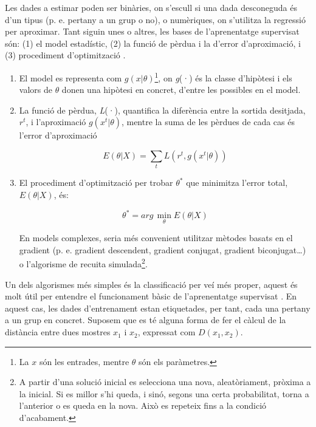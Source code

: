 \documentclass[12pt,a4paper,final,twoside]{article}
\begin{document}
Les dades a estimar poden ser binàries, on s'escull si una dada desconeguda és d'un tipus (p. e. pertany a un grup o no), o numèriques, on s'utilitza la regressió per aproximar. Tant siguin unes o altres, les bases de l'aprenentatge supervisat són: (1) el model estadístic, (2) la funció de pèrdua i la d'error d'aproximació, i (3) procediment d'optimització \cite{Alpaydin2004}.

\begin{enumerate}

\item El model es representa com $g(x|\theta)$\footnote{La $x$ són les entrades, mentre $\theta$ són els paràmetres.}, on \textit{g}(·) és la classe d'hipòtesi i els valors de $\theta$ donen una hipòtesi en concret, d'entre les possibles en el model.

\item La funció de pèrdua, \textit{L}(·), quantifica la diferència entre la sortida desitjada, $r^t$, i l'aproximació $g(x^t|\theta)$, mentre la suma de les pèrdues de cada cas és l'error d'aproximació 

\begin{equation} \label{eq:er-aprox}
E(\theta|X)=\sum_{t} L(r^t,g(x^t|\theta))
\end{equation}

\item El procediment d'optimització per trobar $\theta^*$ que minimitza l'error total, $E(\theta|X)$, és:

\begin{equation} \label{eq:theta-opt}
\theta^*=arg\,\operatorname*{min}_\theta E(\theta|X)
\end{equation}

En models complexes, seria més convenient utilitzar mètodes basats en el gradient (p. e. gradient descendent, gradient conjugat, gradient biconjugat\dots) o l'algorisme de recuita simulada\footnote{A partir d'una solució inicial es selecciona una nova, aleatòriament, pròxima a la inicial. Si es millor s'hi queda, i sinó, segons una certa probabilitat, torna a l'anterior o es queda en la nova. Això es repeteix fins a la condició d'acabament\cite{Torrent-Fontbona2013}.}.

\end{enumerate}

Un dels algorismes més simples és la classificació per veí més proper, aquest és molt útil per entendre el funcionament bàsic de l'aprenentatge supervisat \cite{Learned-Miller2014}. En aquest cas, les dades d'entrenament estan etiquetades, per tant, cada una pertany a un grup en concret. Suposem que es té alguna forma de fer el càlcul de la distància entre dues mostres $x_{1}$ i $x_{2}$, expressat com $D(x_{1}, x_{2})$.
\end{document}
